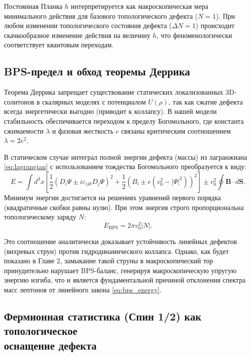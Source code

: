 \documentclass[11pt,a4paper]{article}
\begin{document}
	Постоянная Планка $h$ интерпретируется как макроскопическая мера минимального действия для базового топологического дефекта ($N=1$). При любом изменении топологического состояния дефекта ($\Delta N = 1$) происходит скачкообразное изменение действия на величину $h$, что феноменологически соответствует квантовым переходам.
	
	\subsection{BPS-предел и обход теоремы Деррика}
	Теорема Деррика запрещает существование статических локализованных 3D-солитонов в скалярных моделях с потенциалом $U(\rho)$, так как сжатие дефекта всегда энергетически выгодно (приводит к коллапсу). 
	В нашей модели стабильность обеспечивается переходом к пределу Богомольного, где константа сжимаемости $\lambda$ и фазовая жесткость $e$ связаны критическим соотношением $\lambda = 2e^2$.
	
	В статическом случае интеграл полной энергии дефекта (массы) из лагранжиана \eqref{eq:lagrangian} с использованием тождества Богомольного преобразуется к виду:
	\begin{equation}
		E = \int d^3x \left[ \frac{1}{2} \left( D_i \Psi \pm i \varepsilon_{ijk} D_j \Psi \right)^2 + \frac{1}{2} \left( B_i \pm e(v_0^2 - |\Psi|^2) \right)^2 \right] \pm v_0^2 \oint \mathbf{B} \cdot d\mathbf{S}.
	\end{equation}
	Минимум энергии достигается на решениях уравнений первого порядка (квадратичные скобки равны нулю). При этом энергия строго пропорциональна топологическому заряду $N$:
	\begin{equation}
		E_{\text{BPS}} = 2\pi v_0^2 |N|.
		\label{eq:bps_energy}
	\end{equation}
	
	Это соотношение аналитически доказывает устойчивость линейных дефектов (вихревых струн) против гидродинамического коллапса. Однако, как будет показано в Главе 2, замыкание такой струны в макроскопический тор принудительно нарушает BPS-баланс, генерируя макроскопическую упругую энергию изгиба, что и является фундаментальной причиной отклонения спектра масс лептонов от линейного закона \eqref{eq:bps_energy}.

\subsection{Фермионная статистика (Спин 1/2) как топологическое\\ оснащение дефекта}
\end{document}

